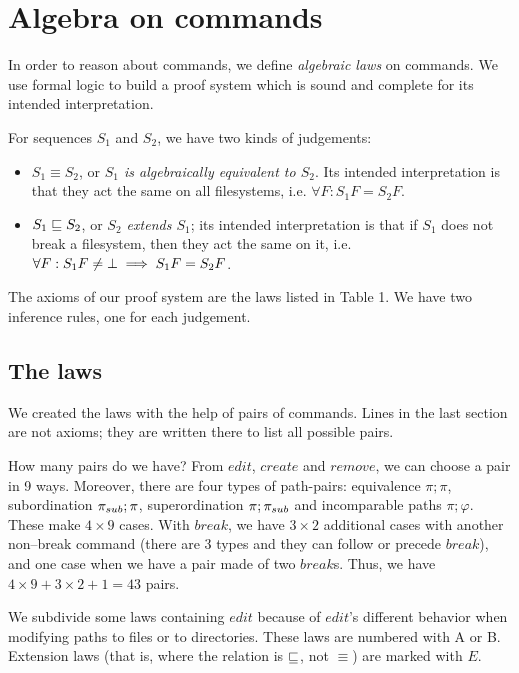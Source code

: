 \section{Algebra on commands}
\label{theorem:laws}

In order to reason about commands, we define \emph{algebraic laws} on
commands. We use formal logic to build a proof system which is sound and
complete for its intended interpretation.

For sequences \(S_1\) and \(S_2\), we have two kinds of judgements:
\begin{itemize}
\item \(S_1\equiv S_2\), or \emph{\(S_1\) is algebraically equivalent to
\(S_2\)}. Its intended interpretation is that they act the same on all
filesystems, i.e. \(\forall F: S_1F=S_2F\).
\item \(S_1\sqsubseteq S_2\), or \emph{\(S_2\) extends \(S_1\)}; its intended
interpretation is that if \(S_1\) does not break a filesystem, then they act
the same on it, i.e. \(\forall F: S_1F\ne\bot \implies S_1F=S_2F\).
\end{itemize}

The axioms of our proof system are the laws listed in Table 1. We have two
inference rules, one for each judgement.

\subsection{The laws}

We created the laws with the help of pairs of commands.
Lines in the last section are not axioms; they are written
there to list all possible pairs.

\medskip
{\small{
How many pairs do we have? 
From
\(edit\), \(create\) and \(remove\), we can choose a pair in 9 ways.
Moreover, there are four types of
path-pairs: equivalence \(\pi;\pi\), subordination \(\pi_{sub};\pi\),
superordination \(\pi;\pi_{sub}\)
and incomparable paths \(\pi;\varphi\). These make \(4\times9\) cases. With \(break\), we have
\(3\times 2\) additional cases
with another non--break command (there are 3 types and they can follow
or precede \(break\)), and one case when we have a pair made of two
\(break\)s. Thus, we have \(4\times 9+3\times2+1=43\) pairs. 
}}
\medskip

We subdivide some laws containing \(edit\) because of \(edit\)'s different
behavior when modifying paths to files or to directories. These laws are
numbered with A or B.
Extension laws (that is, where the relation is \(\sqsubseteq\), not
\(\equiv\)) are marked with \(E\).

